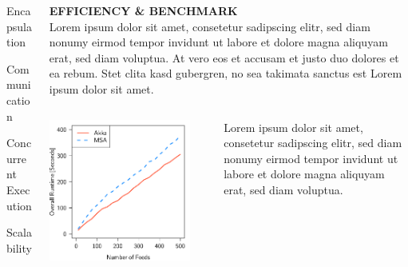 \documentclass[final,hyperref={pdfpagelabels=true}]{beamer}
\begin{document}
\begin{frame}
\begin{columns}[t]
\begin{column}{.45\textwidth}
{        Encapsulation

        Communication

        Concurrent Execution

        Scalability
        
      }
    \end{column}

    \begin{column}{.45\textwidth}
      \textsf{\textbf{EFFICIENCY \& BENCHMARK}} \\
      \vspace*{\baselineskip}
      {\lmodern
        Lorem ipsum dolor sit amet, consetetur sadipscing elitr, sed diam nonumy eirmod tempor invidunt ut labore et dolore magna aliquyam erat, sed diam voluptua. At vero eos et accusam et justo duo dolores et ea rebum. Stet clita kasd gubergren, no sea takimata sanctus est Lorem ipsum dolor sit amet. 
      }

      
      \begin{columns}[t]
        \begin{column}{.4\textwidth}
          \includegraphics[width=1\textwidth]{graphics/eval-index-overall.pdf}
        \end{column}
        \begin{column}{.05\textwidth}
        \end{column}
        \begin{column}{.55\textwidth}
          {\lmodern
            Lorem ipsum dolor sit amet, consetetur sadipscing elitr, sed diam nonumy eirmod tempor invidunt ut labore et dolore magna aliquyam erat, sed diam voluptua.
          }
        \end{column}
      \end{columns}


\end{column}
\end{columns}
\end{frame}
\end{document}
